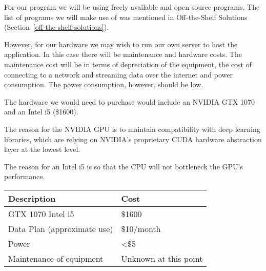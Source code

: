 \documentclass{scrreprt}
\begin{document}
{For our program we will be using freely available and open source programs.
The list of programs we will make use of was mentioned in Off-the-Shelf
Solutions (Section~\ref{off-the-shelf-solutions}).}

{However, for our hardware we may wish to run our own server to host the
application. In this case there will be maintenance and hardware costs.  The
maintenance cost will be in terms of depreciation of the equipment, the cost of
connecting to a network and streaming data over the internet and power
consumption. The power consumption, however, should be low.}

The hardware we would need to purchase would include an NVIDIA GTX 1070 and an
Intel i5 (\$1600).

The reason for the NVIDIA GPU is to maintain compatibility with deep learning
libraries, which are relying on NVIDIA's proprietary CUDA hardware abstraction
layer at the lowest level.

The reason for an Intel i5 is so that the CPU will not bottleneck the GPU's
performance.

\begin{longtable}[c]{@{}ll@{}}
\toprule
\begin{minipage}[t]{0.47\columnwidth}\raggedright\strut
{Description}
\strut\end{minipage} &
\begin{minipage}[t]{0.47\columnwidth}\raggedright\strut
{Cost}
\strut\end{minipage}\tabularnewline\midrule
\begin{minipage}[t]{0.47\columnwidth}\raggedright\strut
{GTX 1070 Intel i5}
\strut\end{minipage} &
\begin{minipage}[t]{0.47\columnwidth}\raggedright\strut
{\$1600}
\strut\end{minipage}\tabularnewline
\begin{minipage}[t]{0.47\columnwidth}\raggedright\strut
{Data Plan (approximate use)}
\strut\end{minipage} &
\begin{minipage}[t]{0.47\columnwidth}\raggedright\strut
{\$10/month}
\strut\end{minipage}\tabularnewline
\begin{minipage}[t]{0.47\columnwidth}\raggedright\strut
{Power}
\strut\end{minipage} &
\begin{minipage}[t]{0.47\columnwidth}\raggedright\strut
{\textless{}\$5}
\strut\end{minipage}\tabularnewline
\begin{minipage}[t]{0.47\columnwidth}\raggedright\strut
{Maintenance of equipment}
\strut\end{minipage} &
\begin{minipage}[t]{0.47\columnwidth}\raggedright\strut
{Unknown at this point}
\strut\end{minipage}\tabularnewline
\bottomrule
\end{longtable}
\end{document}
